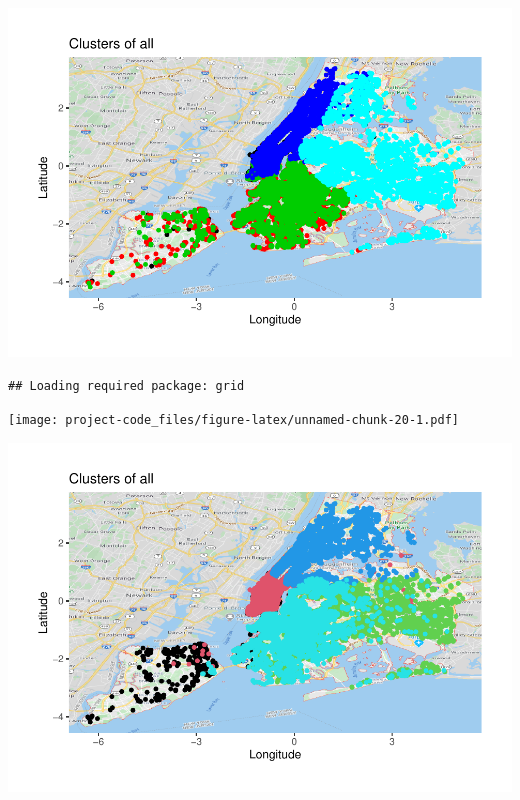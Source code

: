 \documentclass[
]{article}
\newenvironment{Shaded}{\begin{snugshade}}{\end{snugshade}}
\newcommand{\DataTypeTok}[1]{\textcolor[rgb]{0.13,0.29,0.53}{#1}}
\newcommand{\DecValTok}[1]{\textcolor[rgb]{0.00,0.00,0.81}{#1}}
\newcommand{\KeywordTok}[1]{\textcolor[rgb]{0.13,0.29,0.53}{\textbf{#1}}}
\newcommand{\NormalTok}[1]{#1}
\newcommand{\OperatorTok}[1]{\textcolor[rgb]{0.81,0.36,0.00}{\textbf{#1}}}
\begin{document}
\includegraphics{project-code_files/figure-latex/unnamed-chunk-19-1.pdf}

\begin{Shaded}
\end{Shaded}

\begin{verbatim}
## Loading required package: grid
\end{verbatim}

\texttt{[image: project-code\_files/figure-latex/unnamed-chunk-20-1.pdf]}

\begin{Shaded}
\end{Shaded}

\includegraphics{project-code_files/figure-latex/unnamed-chunk-21-1.pdf}
\end{document}
